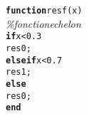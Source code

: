 {\begin{tabbing}
\texttt{\textbf{function}}\texttt{\phantom{x}res\phantom{x}{=}\phantom{x}f{(}x{)}}\\
\textit{\%\phantom{x}fonction\phantom{x}echelon}\\
\texttt{\textbf{if}}\texttt{\phantom{x}x{<}0{.}3}\\
\texttt{\phantom{xxxx}res\phantom{x}{=}\phantom{x}0{;}}\\
\texttt{\textbf{elseif}}\texttt{\phantom{x}x{<}0{.}7}\\
\texttt{\phantom{xxxx}res\phantom{x}{=}\phantom{x}1{;}}\\
\texttt{\textbf{else}}\\
\texttt{\phantom{xxxx}res\phantom{x}{=}\phantom{x}0{;}}\\
\texttt{\textbf{end}}
\end{tabbing}}